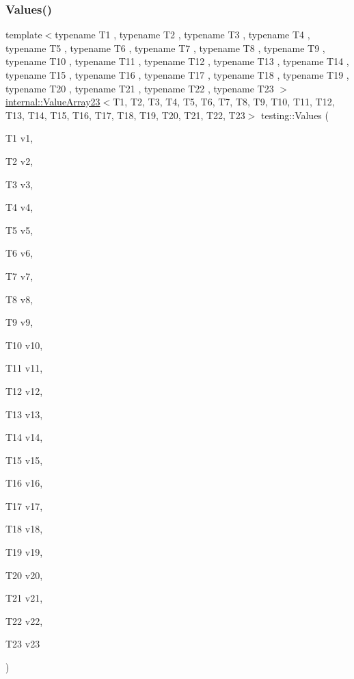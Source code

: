 \subsubsection{\texorpdfstring{Values()}{Values()}\hspace{0.1cm}{\footnotesize\ttfamily [24/51]}}
{\footnotesize\ttfamily template$<$typename T1 , typename T2 , typename T3 , typename T4 , typename T5 , typename T6 , typename T7 , typename T8 , typename T9 , typename T10 , typename T11 , typename T12 , typename T13 , typename T14 , typename T15 , typename T16 , typename T17 , typename T18 , typename T19 , typename T20 , typename T21 , typename T22 , typename T23 $>$ \\
\mbox{\hyperlink{classtesting_1_1internal_1_1_value_array23}{internal\+::\+Value\+Array23}}$<$T1, T2, T3, T4, T5, T6, T7, T8, T9, T10, T11, T12, T13, T14, T15, T16, T17, T18, T19, T20, T21, T22, T23$>$ testing\+::\+Values (\begin{DoxyParamCaption}\item[{T1}]{v1,  }\item[{T2}]{v2,  }\item[{T3}]{v3,  }\item[{T4}]{v4,  }\item[{T5}]{v5,  }\item[{T6}]{v6,  }\item[{T7}]{v7,  }\item[{T8}]{v8,  }\item[{T9}]{v9,  }\item[{T10}]{v10,  }\item[{T11}]{v11,  }\item[{T12}]{v12,  }\item[{T13}]{v13,  }\item[{T14}]{v14,  }\item[{T15}]{v15,  }\item[{T16}]{v16,  }\item[{T17}]{v17,  }\item[{T18}]{v18,  }\item[{T19}]{v19,  }\item[{T20}]{v20,  }\item[{T21}]{v21,  }\item[{T22}]{v22,  }\item[{T23}]{v23 }\end{DoxyParamCaption})}

\mbox{\label{namespacetesting_a74b2375fe8c3c685e6f7b0b6a9b61009}} 
